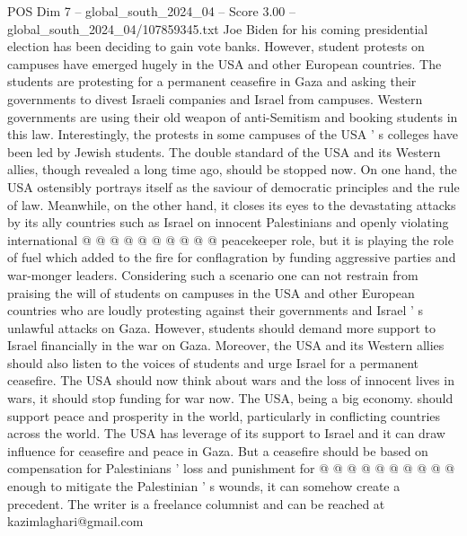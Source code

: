 \begin{textsample}{POS Dim 7 – global\_south\_2024\_04 – Score 3.00 – global\_south\_2024\_04/107859345.txt}
Joe Biden for his coming presidential election has been deciding to gain vote banks.
However, student protests on campuses have emerged hugely in the USA and other European countries.
The students are protesting for a permanent ceasefire in Gaza and asking their governments to divest Israeli companies and Israel from campuses.
Western governments are using their old weapon of anti-Semitism and booking students in this law.
Interestingly, the protests in some campuses of the USA ' s colleges have been led by Jewish students.
The double standard of the USA and its Western allies, though revealed a long time ago, should be stopped now.
On one hand, the USA ostensibly portrays itself as the saviour of democratic principles and the rule of law.
Meanwhile, on the other hand, it closes its eyes to the devastating attacks by its ally countries such as Israel on innocent Palestinians and openly violating international @ @ @ @ @ @ @ @ @ @ peacekeeper role, but it is playing the role of fuel which added to the fire for conflagration by funding aggressive parties and war-monger leaders.
Considering such a scenario one can not restrain from praising the will of students on campuses in the USA and other European countries who are loudly protesting against their governments and Israel ' s unlawful attacks on Gaza.
However, students should demand more support to Israel financially in the war on Gaza.
Moreover, the USA and its Western allies should also listen to the voices of students and urge Israel for a permanent ceasefire.
The USA should now think about wars and the loss of innocent lives in wars, it should stop funding for war now.
The USA, being a big economy. should support peace and prosperity in the world, particularly in conflicting countries across the world.
The USA has leverage of its support to Israel and it can draw influence for ceasefire and peace in Gaza.
But a ceasefire should be based on compensation for Palestinians ' loss and punishment for @ @ @ @ @ @ @ @ @ @ enough to mitigate the Palestinian ' s wounds, it can somehow create a precedent.
The writer is a freelance columnist and can be reached at kazimlaghari@gmail.com

\end{textsample}
